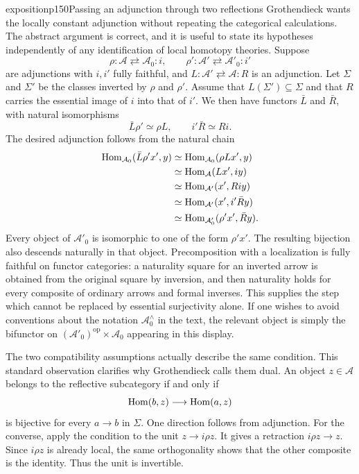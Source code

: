 \begin{dcomment}{exposition}{p150}{Passing an adjunction through two reflections}
Grothendieck wants the locally constant adjunction without repeating the categorical calculations. The abstract argument is correct, and it is useful to state its hypotheses independently of any identification of local homotopy theories. Suppose
\[
 \rho:\mathcal A\rightleftarrows\mathcal A_0:i,
 \qquad
 \rho':\mathcal A'\rightleftarrows\mathcal A'_0:i'
\]
are adjunctions with $i,i'$ fully faithful, and $L:\mathcal A'\rightleftarrows\mathcal A:R$ is an adjunction. Let $\Sigma$ and $\Sigma'$ be the classes inverted by $\rho$ and $\rho'$. Assume that $L(\Sigma')\subseteq\Sigma$ and that $R$ carries the essential image of $i$ into that of $i'$. We then have functors $\bar L$ and $\bar R$, with natural isomorphisms
\[
 \bar L\rho'\simeq\rho L,
 \qquad i'\bar R\simeq Ri.
\]
The desired adjunction follows from the natural chain
\[
\begin{aligned}
 \mathrm{Hom}_{\mathcal A_0}(\bar L\rho' x',y)
 &\simeq\mathrm{Hom}_{\mathcal A_0}(\rho Lx',y)\\
 &\simeq\mathrm{Hom}_{\mathcal A}(Lx',iy)\\
 &\simeq\mathrm{Hom}_{\mathcal A'}(x',Riy)\\
 &\simeq\mathrm{Hom}_{\mathcal A'}(x',i'\bar Ry)\\
 &\simeq\mathrm{Hom}_{\mathcal A'_0}(\rho'x',\bar Ry).
\end{aligned}
\]
Every object of $\mathcal A'_0$ is isomorphic to one of the form $\rho'x'$. The resulting bijection also descends naturally in that object. Precomposition with a localization is fully faithful on functor categories: a naturality square for an inverted arrow is obtained from the original square by inversion, and then naturality holds for every composite of ordinary arrows and formal inverses. This supplies the step which cannot be replaced by essential surjectivity alone. If one wishes to avoid conventions about the notation $\mathcal A_0^{\wedge}$ in the text, the relevant object is simply the bifunctor on $(\mathcal A'_0)^{\mathrm{op}}\times\mathcal A_0$ appearing in this display.

The two compatibility assumptions actually describe the same condition. This standard observation clarifies why Grothendieck calls them dual. An object $z\in\mathcal A$ belongs to the reflective subcategory if and only if
\[
 \mathrm{Hom}(b,z)\longrightarrow\mathrm{Hom}(a,z)
\]
is bijective for every $a\longrightarrow b$ in $\Sigma$. One direction follows from adjunction. For the converse, apply the condition to the unit $z\longrightarrow i\rho z$. It gives a retraction $i\rho z\longrightarrow z$. Since $i\rho z$ is already local, the same orthogonality shows that the other composite is the identity. Thus the unit is invertible.


\end{dcomment}
